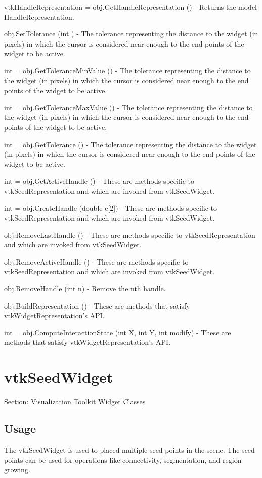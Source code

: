 \begin{DoxyItemize}
\item {\ttfamily vtk\-Handle\-Representation = obj.\-Get\-Handle\-Representation ()} -\/ Returns the model Handle\-Representation.  
\item {\ttfamily obj.\-Set\-Tolerance (int )} -\/ The tolerance representing the distance to the widget (in pixels) in which the cursor is considered near enough to the end points of the widget to be active.  
\item {\ttfamily int = obj.\-Get\-Tolerance\-Min\-Value ()} -\/ The tolerance representing the distance to the widget (in pixels) in which the cursor is considered near enough to the end points of the widget to be active.  
\item {\ttfamily int = obj.\-Get\-Tolerance\-Max\-Value ()} -\/ The tolerance representing the distance to the widget (in pixels) in which the cursor is considered near enough to the end points of the widget to be active.  
\item {\ttfamily int = obj.\-Get\-Tolerance ()} -\/ The tolerance representing the distance to the widget (in pixels) in which the cursor is considered near enough to the end points of the widget to be active.  
\item {\ttfamily int = obj.\-Get\-Active\-Handle ()} -\/ These are methods specific to vtk\-Seed\-Representation and which are invoked from vtk\-Seed\-Widget.  
\item {\ttfamily int = obj.\-Create\-Handle (double e\mbox{[}2\mbox{]})} -\/ These are methods specific to vtk\-Seed\-Representation and which are invoked from vtk\-Seed\-Widget.  
\item {\ttfamily obj.\-Remove\-Last\-Handle ()} -\/ These are methods specific to vtk\-Seed\-Representation and which are invoked from vtk\-Seed\-Widget.  
\item {\ttfamily obj.\-Remove\-Active\-Handle ()} -\/ These are methods specific to vtk\-Seed\-Representation and which are invoked from vtk\-Seed\-Widget.  
\item {\ttfamily obj.\-Remove\-Handle (int n)} -\/ Remove the nth handle.  
\item {\ttfamily obj.\-Build\-Representation ()} -\/ These are methods that satisfy vtk\-Widget\-Representation's A\-P\-I.  
\item {\ttfamily int = obj.\-Compute\-Interaction\-State (int X, int Y, int modify)} -\/ These are methods that satisfy vtk\-Widget\-Representation's A\-P\-I.  
\end{DoxyItemize}\hypertarget{vtkwidgets_vtkseedwidget}{}\section{vtk\-Seed\-Widget}\label{vtkwidgets_vtkseedwidget}
Section\-: \hyperlink{sec_vtkwidgets}{Visualization Toolkit Widget Classes} \hypertarget{vtkwidgets_vtkxyplotwidget_Usage}{}\subsection{Usage}\label{vtkwidgets_vtkxyplotwidget_Usage}
The vtk\-Seed\-Widget is used to placed multiple seed points in the scene. The seed points can be used for operations like connectivity, segmentation, and region growing.

